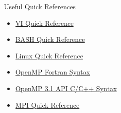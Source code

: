 \documentclass[final,t]{beamer}
\begin{document}
\begin{frame}[fragile]{}
\begin{columns}[t]
\begin{column}{.32\linewidth}
      \begin{block}{Useful Quick References}
        \vspace*{-3ex}
        \begin{multicols}{2}
        \begin{itemize}
        \item \href{https://wiki.auckland.ac.nz/download/attachments/37950883/vi+Quick+Reference.pdf}{VI Quick Reference}
        \item \href{https://wiki.auckland.ac.nz/download/attachments/37950883/Bash+Quick+Reference.pdf}{BASH Quick Reference} 
        \item \href{https://wiki.auckland.ac.nz/download/attachments/65014423/fwunixref.pdf?version=1&modificationDate=1399584680387&api=v2}{Linux Quick Reference}
        \item \href{https://wiki.auckland.ac.nz/download/attachments/57639811/OpenMP3.1-FortranCard.pdf?version=1&modificationDate=1399506093589&api=v2}{OpenMP Fortran Syntax}
        \item \href{https://wiki.auckland.ac.nz/download/attachments/57639811/OpenMP3.1-CCard.pdf?version=1&modificationDate=1399506057930&api=v2}{OpenMP 3.1 API C/C++ Syntax}
        \item \href{https://wiki.auckland.ac.nz/download/attachments/57639811/mpi-quick-ref.pdf?version=1&modificationDate=1399506030365&api=v2}{MPI Quick Reference}
        \end{itemize}
        \end{multicols}
        \vspace*{-3ex}
      \end{block}


\end{column}
\end{columns}
\end{frame}
\end{document}
